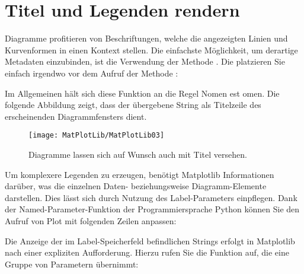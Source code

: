 \section{Titel und Legenden rendern}

Diagramme profitieren von Beschriftungen, welche die angezeigten Linien und Kurvenformen in einen Kontext stellen. Die einfachste Möglichkeit, um derartige Metadaten einzubinden, ist die Verwendung der Methode . Die platzieren Sie einfach irgendwo vor dem Aufruf der Methode :

\medskip




\medskip

Im Allgemeinen hält sich diese Funktion an die Regel Nomen est omen. Die folgende Abbildung zeigt, dass der übergebene String als Titelzeile des erscheinenden Diagrammfensters dient.

\begin{figure}
  \begin{center}  
    \texttt{[image: MatPlotLib/MatPlotLib03]}      
        
    \caption{Diagramme lassen sich auf Wunsch auch mit Titel versehen.}\label{Matplotlib03}
  \end{center}    
\end{figure}


Um komplexere Legenden zu erzeugen, benötigt Matplotlib Informationen darüber, was die einzelnen Daten- beziehungsweise Diagramm-Elemente darstellen. Dies lässt sich durch Nutzung des Label-Parameters einpflegen. Dank der Named-Parameter-Funktion der Programmiersprache Python können Sie den Aufruf von Plot mit folgenden Zeilen anpassen:

\medskip




\medskip

Die Anzeige der im Label-Speicherfeld befindlichen Strings erfolgt in Matplotlib nach einer expliziten Aufforderung. Hierzu rufen Sie die Funktion  auf, die eine Gruppe von Parametern übernimmt:

\medskip

